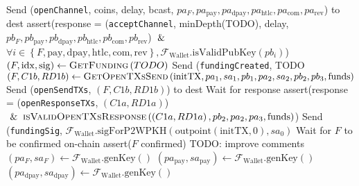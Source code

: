\begin{algorithmic}[1]
      \EndIndent
      \State Send (\texttt{openChannel}, coins, delay, bcast,
      \Indent
        \State $pa_F, pa_{\mathrm{pay}}, pa_{\mathrm{dpay}}, pa_{\mathrm{htlc}},
        pa_{\mathrm{com}}, pa_{\mathrm{rev}}$) to dest
      \EndIndent
      \State assert(response = (\texttt{acceptChannel}, minDepth(TODO), delay,
      \Indent
        \State $pb_F, pb_{\mathrm{pay}}, pb_{\mathrm{dpay}}, pb_{\mathrm{htlc}},
        pb_{\mathrm{com}}, pb_{\mathrm{rev}}$) $\And$
        \State $\forall i \in \left\{F, \mathrm{pay}, \mathrm{dpay}, \mathrm{htlc},
        \mathrm{com}, \mathrm{rev}\right\},
        \mathcal{F}_{\mathrm{Wallet}}.\mathrm{isValidPubKey}\left(pb_i\right)$)
      \EndIndent
      \State $\left(F, \mathrm{idx}, \mathrm{sig}\right) \gets
      \textsc{GetFunding}\left(TODO\right)$
      \State Send (\texttt{fundingCreated}, TODO
      \State $\left(F, C1b, RD1b\right) \gets
      \textsc{GetOpenTXsSend}\left(\mathrm{initTX}, pa_1, sa_1, pb_1, pa_2, sa_2,
      pb_2, pb_3, \mathrm{funds}\right)$
      \State Send (\texttt{openSendTXs}, $\left(F, C1b, RD1b\right)$) to dest
      \State Wait for response
      \State assert(response = (\texttt{openResponseTXs}, $\left(C1a, RD1a\right)$)
      \Indent
        \State $\And \textsc{isValidOpenTXsResponse}\left(\left(C1a, RD1a\right), pb_2,
        pa_2, pa_3, \mathrm{funds}\right)$)
      \EndIndent
      \State Send (\texttt{fundingSig}, $\mathcal{F}_{\mathrm{Wallet}}.\text{sigForP2WPKH}
      \left(\mathrm{outpoint}\left(\mathrm{initTX}, 0\right), sa_0\right)$
      \State Wait for $F$ to be confirmed on-chain
      \State assert($F$ confirmed) 
    \EndFunction
    \State
\State TODO: improve comments
      \State $\left(pa_F, sa_F\right) \leftarrow
      \mathcal{F}_{\mathrm{Wallet}}.\mathrm{genKey}\left(\right)$ 
      \State $\left(pa_{\mathrm{pay}}, sa_{\mathrm{pay}}\right) \leftarrow
      \mathcal{F}_{\mathrm{Wallet}}.\mathrm{genKey}\left(\right)$ 
      \State $\left(pa_{\mathrm{dpay}}, sa_{\mathrm{dpay}}\right) \leftarrow
      \mathcal{F}_{\mathrm{Wallet}}.\mathrm{genKey}\left(\right)$ 
\end{algorithmic}
